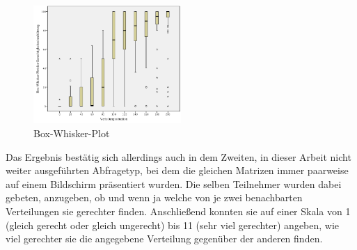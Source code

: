 \documentclass[a4paper]{thesis}
\begin{document}
\begin{figure}[H]
\centering
\includegraphics[width=0.5\textwidth]{figures/box.png}
\caption[Box-Whisker-Plot]{Box-Whisker-Plot}
\end{figure}

Das Ergebnis bestätig sich allerdings auch in dem Zweiten, in dieser Arbeit nicht weiter ausgeführten Abfragetyp, bei dem die gleichen Matrizen immer paarweise auf einem Bildschirm präsentiert wurden. Die selben Teilnehmer wurden dabei gebeten, anzugeben, ob und wenn ja welche von je zwei benachbarten Verteilungen sie gerechter finden. Anschließend konnten sie auf einer Skala von 1 (gleich gerecht oder gleich ungerecht) bis 11 (sehr viel gerechter) angeben, wie viel gerechter sie die angegebene Verteilung gegenüber der anderen finden.
\end{document}

